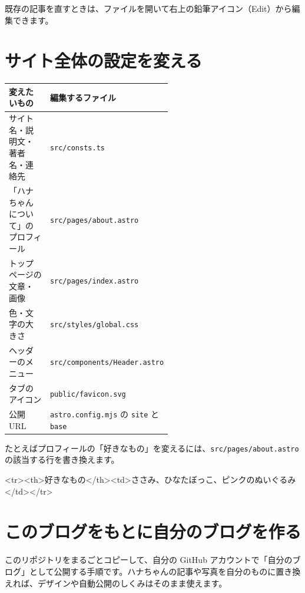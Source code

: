\documentclass[a4paper,11pt]{ltjsarticle}
\newcommand{\file}[1]{\texttt{#1}}
\begin{document}
既存の記事を直すときは、ファイルを開いて右上の鉛筆アイコン（Edit）から編集できます。

\section{サイト全体の設定を変える}\label{sec:settings}

\begin{center}
\begin{tabular}{@{}lp{0.55\linewidth}@{}}
\toprule
変えたいもの & 編集するファイル \\
\midrule
サイト名・説明文・著者名・連絡先 & \file{src/consts.ts} \\
「ハナちゃんについて」のプロフィール & \file{src/pages/about.astro} \\
トップページの文章・画像 & \file{src/pages/index.astro} \\
色・文字の大きさ & \file{src/styles/global.css} \\
ヘッダーのメニュー & \file{src/components/Header.astro} \\
タブのアイコン & \file{public/favicon.svg} \\
公開URL & \file{astro.config.mjs} の \file{site} と \file{base} \\
\bottomrule
\end{tabular}
\end{center}

たとえばプロフィールの「好きなもの」を変えるには、\file{src/pages/about.astro} の該当する行を書き換えます。

\begin{code}
<tr><th>好きなもの</th><td>ささみ、ひなたぼっこ、ピンクのぬいぐるみ</td></tr>
\end{code}

\section{このブログをもとに自分のブログを作る}\label{sec:own}

このリポジトリをまるごとコピーして、自分の GitHub アカウントで「自分のブログ」として公開する手順です。ハナちゃんの記事や写真を自分のものに置き換えれば、デザインや自動公開のしくみはそのまま使えます。
\end{document}
